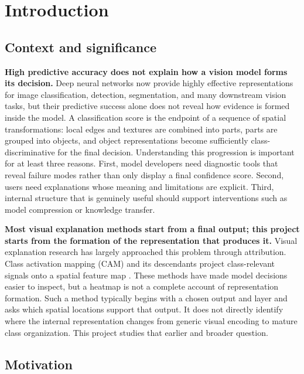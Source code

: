 \section{Introduction}\label{sec:introduction}

\subsection{Context and significance}

\textbf{High predictive accuracy does not explain how a vision model forms its
decision.} Deep neural networks now provide highly effective representations
for image classification, detection, segmentation, and many downstream vision
tasks, but their predictive success alone does not reveal how evidence is
formed inside the model. A classification score is the endpoint of a sequence
of spatial transformations: local edges and textures are combined into parts,
parts are grouped into objects, and object representations become sufficiently
class-discriminative for the final decision. Understanding this progression is
important for at least three reasons. First, model developers need diagnostic
tools that reveal failure modes rather than only display a final confidence
score. Second, users need explanations whose meaning and limitations are
explicit. Third, internal structure that is genuinely useful should support
interventions such as model compression or knowledge transfer.

\textbf{Most visual explanation methods start from a final output; this project
starts from the formation of the representation that produces it.} Visual
explanation research has largely approached this problem through attribution.
Class activation mapping (CAM) and its descendants project
class-relevant signals onto a spatial feature map
\cite{zhou2016cam,selvaraju2017gradcam,chattopadhay2018gradcampp}. These
methods have made model decisions easier to inspect, but a heatmap is not a
complete account of representation formation. Such a method typically begins
with a chosen output and layer and asks which spatial locations support that
output. It does not directly identify where the internal representation changes
from generic visual encoding to mature class organization. This project studies
that earlier and broader question.

\subsection{Motivation}


